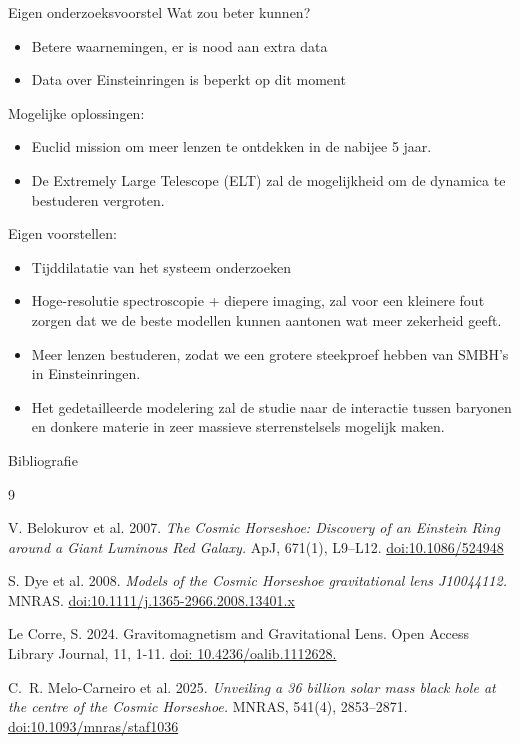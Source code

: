 \documentclass[aspectratio=169,xcolor=dvipsnames]{beamer}
\begin{document}
\begin{frame}{Eigen onderzoeksvoorstel}
    Wat zou beter kunnen?
    \begin{itemize}
        \item Betere waarnemingen, er is nood aan extra data
        \item Data over Einsteinringen is beperkt op dit moment

    \end{itemize}

    Mogelijke oplossingen:
    \begin{itemize}
        \item Euclid mission om meer lenzen te ontdekken in de nabijee 5 jaar.
        \item De Extremely Large Telescope (ELT) zal de mogelijkheid om de dynamica te bestuderen vergroten.
    \end{itemize}
    Eigen voorstellen:
    \begin{itemize}
        \item Tijddilatatie van het systeem onderzoeken
        \item Hoge-resolutie spectroscopie + diepere imaging, zal voor een kleinere fout zorgen dat we de beste modellen kunnen aantonen wat meer zekerheid geeft.
        \item Meer lenzen bestuderen, zodat we een grotere steekproef hebben van SMBH's in Einsteinringen.
        \item Het gedetailleerde modelering zal de studie naar de interactie tussen baryonen en donkere materie in zeer massieve sterrenstelsels mogelijk maken.
    \end{itemize}


\end{frame}


\begin{frame}{Bibliografie}
  \begin{thebibliography}{9}

    V. Belokurov et al. 2007.
    \textit{The Cosmic Horseshoe: Discovery of an Einstein Ring around a Giant Luminous Red Galaxy.}
    ApJ, 671(1), L9–L12.
    \href{https://doi.org/10.1086/524948}{doi:10.1086/524948}

    S. Dye et al. 2008.
    \textit{Models of the Cosmic Horseshoe gravitational lens J10044112.}
    MNRAS.
    \href{https://doi.org/10.1111/j.1365-2966.2008.13401.x}{doi:10.1111/j.1365-2966.2008.13401.x}



    Le Corre, S. 2024. Gravitomagnetism and Gravitational Lens. Open Access Library Journal, 11, 1-11. \href{https://www.scirp.org/journal/paperinformation?paperid=138088}{doi: 10.4236/oalib.1112628.}

    C.~R. Melo-Carneiro et al. 2025.
    \textit{Unveiling a 36 billion solar mass black hole at the centre of the Cosmic Horseshoe.}
    MNRAS, 541(4), 2853–2871.
    \href{https://doi.org/10.1093/mnras/staf1036}{doi:10.1093/mnras/staf1036}




  \end{thebibliography}
\end{frame}
\end{document}

